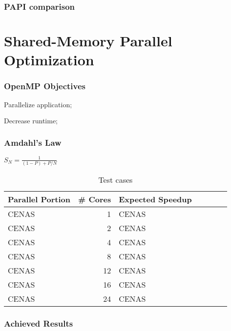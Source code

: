\documentclass{beamer}
\begin{document}
\begin{frame}
	\frametitle{PAPI comparison}
	\begin{figure}[!htp]
	\label{fig:original_papi}
	\end{figure}
	\begin{figure}[!htp]
	\label{fig:optm_papi}
	\end{figure}
\end{frame}


\section{Shared-Memory Parallel Optimization}
\begin{frame}
	\frametitle{OpenMP Objectives}
	\begin{description}
		\item Parallelize application;
		\item Decrease runtime;
	\end{description}
\end{frame}	


\begin{frame}
	\frametitle{Amdahl's Law}
		
		$S_{N}=\frac{1}{(1-P) + P/N}$

		\begin{center}
			\begin{table}[!htp]
			\begin{tabular}{lrlrlrl}
			\hline
			\textbf{Parallel Portion} & \textbf{\# Cores} & \textbf{Expected Speedup}\\
			\hline
			CENAS & 1 & CENAS \\
			CENAS & 2 & CENAS \\
			CENAS & 4 & CENAS \\
			CENAS & 8 & CENAS \\
			CENAS & 12 & CENAS \\
			CENAS & 16 & CENAS \\
			CENAS & 24 & CENAS \\
			\hline
			\end{tabular}
			\caption{Test cases}
			\label{tab:testcases}
			\end{table}
		\end{center}	
\end{frame}

\begin{frame}
	\frametitle{Achieved Results}
	\begin{figure}[!htp]
	\label{fig:optm_papi}
	\end{figure}
\end{frame}
\end{document}
